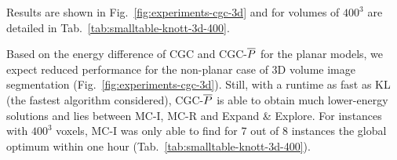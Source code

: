 Results are shown
in Fig.~\ref{fig:experiments-cgc-3d}
and for volumes of $400^3$ are detailed in 
Tab.~\ref{tab:smalltable-knott-3d-400}.

Based on the energy difference of CGC and CGC-$\overline{P}$ for the planar models,
we expect reduced performance for the non-planar case of 3D volume image
segmentation (Fig.~\ref{fig:experiments-cgc-3d}). Still, with a runtime
as fast as KL (the fastest algorithm considered),
CGC-$\overline{P}$ is able to obtain much lower-energy solutions and
lies between MC-I, MC-R and Expand \& Explore.
%
For instances with $400^3$ voxels, MC-I was only able to find for 7 out of 
8 instances the global optimum within one hour
(Tab.~\ref{tab:smalltable-knott-3d-400}).


